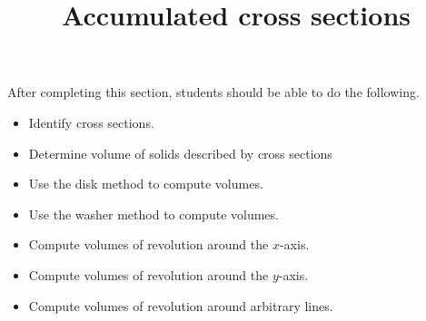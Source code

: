 \documentclass{ximera}
\title{Accumulated cross sections}
\begin{document}
\begin{abstract}
\end{abstract}

\maketitle

\begin{sectionOutcomes}

After completing this section, students should be able to do the following.

\begin{itemize}
\item Identify cross sections.
\item Determine volume of solids described by cross sections
\item Use the disk method to compute volumes.
\item Use the washer method to compute volumes.
\item Compute volumes of revolution around the $x$-axis.
\item Compute volumes of revolution around the $y$-axis.
\item Compute volumes of revolution around arbitrary lines.
\end{itemize}

\end{sectionOutcomes}
\end{document}
